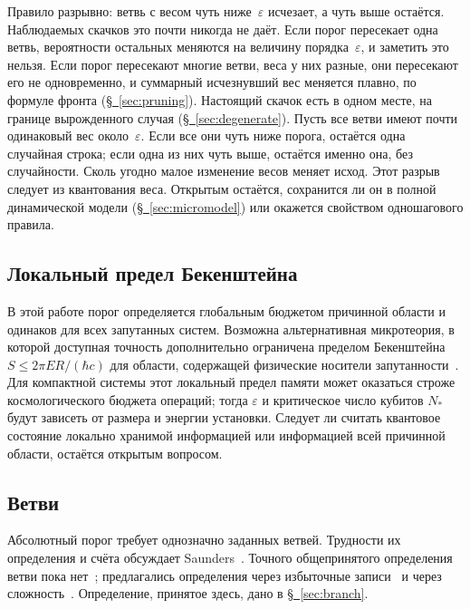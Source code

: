 \documentclass[11pt,a4paper]{article}
\begin{document}
Правило разрывно: ветвь с весом чуть ниже~$\varepsilon$ исчезает, а чуть выше остаётся. Наблюдаемых скачков это почти никогда не даёт. Если порог пересекает одна ветвь, вероятности остальных меняются на величину порядка~$\varepsilon$, и заметить это нельзя. Если порог пересекают многие ветви, веса у них разные, они пересекают его не одновременно, и суммарный исчезнувший вес меняется плавно, по формуле фронта (\hyperref[sec:pruning]{\S~\ref*{sec:pruning}}). Настоящий скачок есть в одном месте, на границе вырожденного случая (\hyperref[sec:degenerate]{\S~\ref*{sec:degenerate}}). Пусть все ветви имеют почти одинаковый вес около~$\varepsilon$. Если все они чуть ниже порога, остаётся одна случайная строка; если одна из них чуть выше, остаётся именно она, без случайности. Сколь угодно малое изменение весов меняет исход. Этот разрыв следует из квантования веса. Открытым остаётся, сохранится ли он в полной динамической модели (\hyperref[sec:micromodel]{\S~\ref*{sec:micromodel}}) или окажется свойством одношагового правила.

\subsection{Локальный предел Бекенштейна}

В этой работе порог определяется глобальным бюджетом причинной области и одинаков для всех запутанных систем. Возможна альтернативная микротеория, в которой доступная точность дополнительно ограничена пределом Бекенштейна $S\le 2\pi ER/(\hbar c)$ для области, содержащей физические носители запутанности~\cite{bousso2002}. Для компактной системы этот локальный предел памяти может оказаться строже космологического бюджета операций; тогда $\varepsilon$ и критическое число кубитов $N_*$ будут зависеть от размера и энергии установки. Следует ли считать квантовое состояние локально хранимой информацией или информацией всей причинной области, остаётся открытым вопросом.

\subsection{Ветви}

Абсолютный порог требует однозначно заданных ветвей. Трудности их определения и счёта обсуждает Saunders~\cite{saunders2021}. Точного общепринятого определения ветви пока нет~\cite{riedel2025}; предлагались определения через избыточные записи~\cite{riedel2017} и через сложность~\cite{weingarten2022,taylor2025}. Определение, принятое здесь, дано в \hyperref[sec:branch]{\S~\ref*{sec:branch}}.
\end{document}
